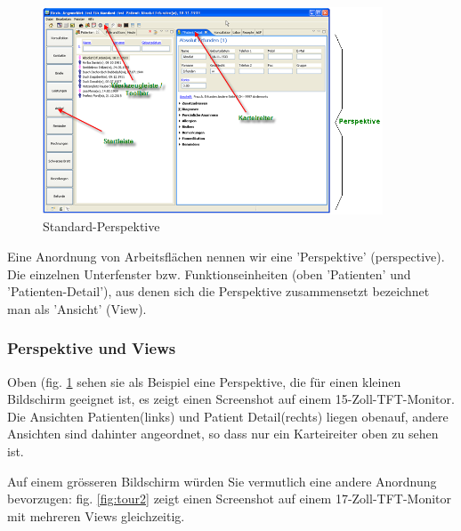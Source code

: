 \begin{figure}[htp]
\begin{center}
  \includegraphics[width=0.9\textwidth]{images/tour1}
  \caption{Standard-Perspektive}
  \label{fig:tour1}
\end{center}
\end{figure}

Eine Anordnung von Arbeitsflächen nennen wir eine 'Perspektive' (perspective). Die einzelnen Unterfenster bzw. Funktionseinheiten (oben 'Patienten' und 'Patienten-Detail'), aus denen sich die Perspektive zusammensetzt bezeichnet man als 'Ansicht' (View).

\subsubsection{Perspektive und Views}

Oben (fig. \ref{fig:tour1} sehen sie als Beispiel eine Perspektive, die für einen kleinen Bildschirm geeignet ist, es zeigt einen Screenshot auf einem 15-Zoll-TFT-Monitor. Die Ansichten \glqq
Patienten\grqq{}(links) und \glqq Patient Detail\grqq{}(rechts) liegen obenauf,
andere Ansichten sind dahinter angeordnet, so dass nur ein Karteireiter oben
zu sehen ist.

Auf einem grösseren Bildschirm würden Sie vermutlich eine andere Anordnung
bevorzugen: fig. \ref{fig:tour2} zeigt einen Screenshot auf einem
17-Zoll-TFT-Monitor mit mehreren Views gleichzeitig.


